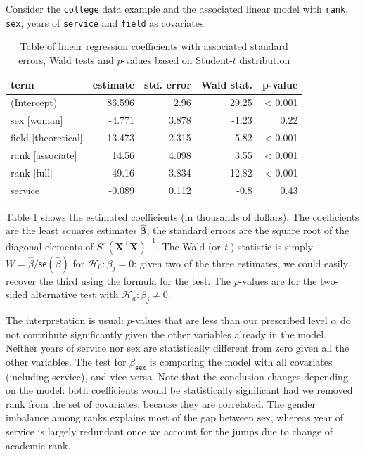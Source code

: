 \documentclass[
  11pt,
  letterpaper,
]{book}
\theoremstyle{definition}
\theoremstyle{definition}
\theoremstyle{definition}
\theoremstyle{definition}
\theoremstyle{remark}
\begin{document}
Consider the \texttt{college} data example and the associated linear model with \texttt{rank}, \texttt{sex}, years of \texttt{service} and \texttt{field} as covariates.

\begin{table}

\caption{\label{tab:summarytestslmcollege}Table of linear regression coefficients with associated standard errors, Wald tests and $p$-values based on Student-$t$ distribution}
\centering
\begin{tabular}[t]{lrrrr}
\toprule
term & estimate & std. error & Wald stat. & p-value\\
\midrule
(Intercept) & 86.596 & 2.96 & 29.25 & < 0.001\\
sex [woman] & -4.771 & 3.878 & -1.23 & 0.22\\
field [theoretical] & -13.473 & 2.315 & -5.82 & < 0.001\\
rank [associate] & 14.56 & 4.098 & 3.55 & < 0.001\\
rank [full] & 49.16 & 3.834 & 12.82 & < 0.001\\
\addlinespace
service & -0.089 & 0.112 & -0.8 & 0.43\\
\bottomrule
\end{tabular}
\end{table}

Table \ref{tab:summarytestslmcollege} shows the estimated coefficients (in thousands of dollars). The coefficients are the least squares estimates \(\widehat{\boldsymbol{\beta}}\), the standard errors are the square root of the diagonal elements of \(S^2(\mathbf{X}^\top\mathbf{X})^{-1}\). The Wald (or \emph{t}-) statistic is simply \(W=\widehat{\beta}/\mathsf{se}(\widehat{\beta})\) for \(\mathscr{H}_0: \beta_j=0\): given two of the three estimates, we could easily recover the third using the formula for the test. The \(p\)-values are for the two-sided alternative test with \(\mathscr{H}_a: \beta_j \neq 0\).

The interpretation is usual: \(p\)-values that are less than our prescribed level \(\alpha\) do not contribute significantly given the other variables already in the model. Neither years of service nor sex are statistically different from zero given all the other variables. The test for \(\beta_{\texttt{sex}}\) is comparing the model with all covariates (including service), and vice-versa. Note that the conclusion changes depending on the model: both coefficients would be statistically significant had we removed rank from the set of covariates, because they are correlated. The gender imbalance among ranks explains most of the gap between sex, whereas year of service is largely redundant once we account for the jumps due to change of academic rank.
\end{document}
